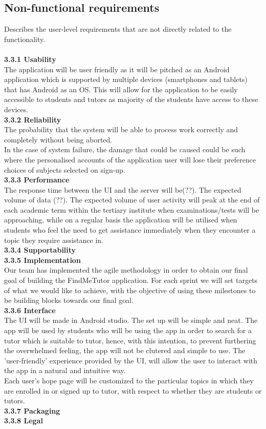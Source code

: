 \documentclass[12pt]{article}
\begin{document}
\subsection{Non-functional requirements}{
Describes the user-level requirements that are not directly related to the functionality. \\
\\\textbf{3.3.1 Usability}\\ 
The application will be user friendly as it will be pitched as an Android application which is supported by multiple devices (smartphones and tablets) that has Android as an OS. This will allow for the application to be easily accessible to students and tutors as majority of the students have access to these devices. 
\\\textbf{3.3.2 Reliability}\\
The probability that the system will be able to process work correctly and completely without being aborted.\\
In the case of system failure, the damage that could be caused could be such where the personalised accounts of the application user will lose their preference choices of subjects selected on sign-up. 
\\\textbf{3.3.3 Performance}\\
The response time between the UI and the server will be(??). The expected volume of data (??). The expected volume of user activity will peak at the end of each academic term within the tertiary institute when examinations/tests will be approaching, while on a regular basis the application will be utilised when students who feel the need to get assistance immediately when they encounter a topic they require assistance in. 
\\\textbf{3.3.4 Supportability}\\
\textbf{3.3.5 Implementation}\\
Our team has implemented the agile methodology in order to obtain our final goal of building the FindMeTutor application. For each sprint we will set targets of what we would like to achieve, with the objective of using these milestones to be building blocks towards our final goal. 
\\\textbf{3.3.6 Interface}\\
The UI will be made in Android studio. The set up will be simple and neat. The app will be used by students who will be using the app in order to search for a tutor which is suitable to tutor, hence, with this intention, to prevent furthering the overwhelmed feeling, the app will not be clutered and simple to use. The 'user-friendly' experience provided by the UI, will allow the user to interact with the app in a natural and intuitive way. \\
Each user's hope page will be customized to the particular topics in which they are enrolled in or signed up to tutor, with respect to whether they are students or tutors. \\
\textbf{3.3.7 Packaging}\\
\textbf{3.3.8 Legal}\\
}
\end{document}

